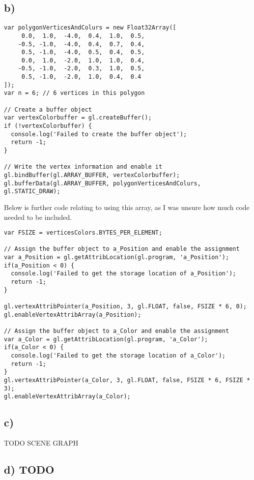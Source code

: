\documentclass[a4paper,12pt]{article}
\begin{document}
\subsection*{b)}
\begin{verbatim}
var polygonVerticesAndColurs = new Float32Array([
     0.0,  1.0,  -4.0,  0.4,  1.0,  0.5,
    -0.5, -1.0,  -4.0,  0.4,  0.7,  0.4,
     0.5, -1.0,  -4.0,  0.5,  0.4,  0.5,
     0.0,  1.0,  -2.0,  1.0,  1.0,  0.4,
    -0.5, -1.0,  -2.0,  0.3,  1.0,  0.5,
     0.5, -1.0,  -2.0,  1.0,  0.4,  0.4
]);
var n = 6; // 6 vertices in this polygon

// Create a buffer object
var vertexColorbuffer = gl.createBuffer();
if (!vertexColorbuffer) {
  console.log('Failed to create the buffer object');
  return -1;
}

// Write the vertex information and enable it
gl.bindBuffer(gl.ARRAY_BUFFER, vertexColorbuffer);
gl.bufferData(gl.ARRAY_BUFFER, polygonVerticesAndColurs, gl.STATIC_DRAW);
\end{verbatim}
Below is further code relating to using this array, as I was unsure how much code needed to be included.\newpage
\begin{verbatim}
var FSIZE = verticesColors.BYTES_PER_ELEMENT;

// Assign the buffer object to a_Position and enable the assignment
var a_Position = gl.getAttribLocation(gl.program, 'a_Position');
if(a_Position < 0) {
  console.log('Failed to get the storage location of a_Position');
  return -1;
}

gl.vertexAttribPointer(a_Position, 3, gl.FLOAT, false, FSIZE * 6, 0);
gl.enableVertexAttribArray(a_Position);

// Assign the buffer object to a_Color and enable the assignment
var a_Color = gl.getAttribLocation(gl.program, 'a_Color');
if(a_Color < 0) {
  console.log('Failed to get the storage location of a_Color');
  return -1;
}
gl.vertexAttribPointer(a_Color, 3, gl.FLOAT, false, FSIZE * 6, FSIZE * 3);
gl.enableVertexAttribArray(a_Color);
\end{verbatim}

\subsection*{c)}
TODO SCENE GRAPH

\subsection*{d) TODO}
\end{document}
